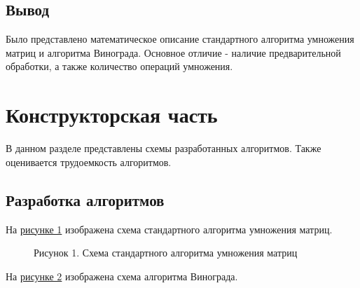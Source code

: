 \documentclass[12pt]{report}
\begin{document}
	\section{Вывод}
	Было представлено математическое описание стандартного алгоритма умножения матриц и алгоритма Винограда. Основное отличие - наличие предварительной обработки, а также количество операций умножения.
	
	\newpage
	\chapter{Конструкторская часть}
	В данном разделе представлены схемы разработанных алгоритмов. Также оценивается трудоемкость алгоритмов.
	\section{Разработка алгоритмов}
	На \hyperref[Algorithm1]{рисунке 1} изображена схема стандартного алгоритма умножения матриц.
	\begin{figure}[h!]\label{Algorithm1}
		\caption*{Рисунок 1. Схема стандартного алгоритма умножения матриц}
	\end{figure}
	\newpage
	На \hyperref[Algorithm2]{рисунке 2} изображена схема алгоритма Винограда.
\end{document}
